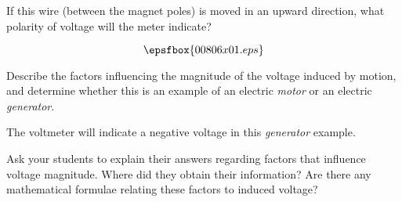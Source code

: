 

If this wire (between the magnet poles) is moved in an upward direction, what polarity of voltage will the meter indicate?

$$\epsfbox{00806x01.eps}$$

Describe the factors influencing the magnitude of the voltage induced by motion, and determine whether this is an example of an electric {\it motor} or an electric {\it generator}.







The voltmeter will indicate a negative voltage in this {\it generator} example.







Ask your students to explain their answers regarding factors that influence voltage magnitude.  Where did they obtain their information?  Are there any mathematical formulae relating these factors to induced voltage?




